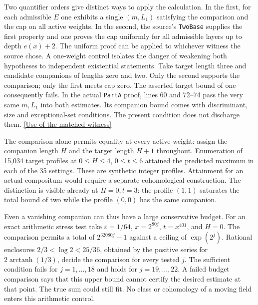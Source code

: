 \documentclass[12pt,letterpaper]{article}
\begin{document}
Two quantifier orders give distinct ways to apply the calculation. In the first, for each admissible \(E\) one exhibits a single \((m,L_1)\) satisfying the comparison and the cap on all active weights. In the second, the source's \texttt{TwoBase} supplies the first property and one proves the cap uniformly for all admissible layers up to depth \(e(x)+2\). The uniform proof can be applied to whichever witness the source chose. A one-weight control isolates the danger of weakening both hypotheses to independent existential statements. Take target length three and candidate companions of lengths zero and two. Only the second supports the comparison; only the first meets cap zero. The asserted target bound of one consequently fails. In the actual \texttt{PartA} proof, lines 60 and 72--74 pass the very same \(m,L_1\) into both estimates. Its companion bound comes with discriminant, size and exceptional-set conditions. The present condition does not discharge them.
\href{https://github.com/nousentllc/riemann-hypothesis/blob/40e56bab026552e089d7afcfeff08d2defb9c005/src/Development/AutomorphicArithmetic/AutomorphicVarieties/LayeredIsomorphisms/PartA.lean#L57-L78}{[Use of the matched witness]}

The comparison alone permits equality at every active weight: assign the companion length \(H\) and the target length \(H+1\) throughout. Enumeration of 15,034 target profiles at \(0\le H\le4\), \(0\le t\le6\) attained the predicted maximum in each of the 35 settings. These are synthetic integer profiles. Attainment for an actual compositum would require a separate cohomological construction. The distinction is visible already at \(H=0,t=3\): the profile \((1,1)\) saturates the total bound of two while the profile \((0,0)\) has the same companion.

Even a vanishing companion can thus have a large conservative budget. For an exact arithmetic stress test take \(\varepsilon=1/64\), \(x=2^{80j}\), \(t=x^{401}\), and \(H=0\). The comparison permits a total of \(2^{32080j}-1\) against a ceiling of \(\exp(2^j)\). Rational enclosures \(2/3<\log 2<25/36\), obtained by the positive series for \(2\operatorname{arctanh}(1/3)\), decide the comparison for every tested \(j\). The sufficient condition fails for \(j=1,\ldots,18\) and holds for \(j=19,\ldots,22\). A failed budget comparison says that this upper bound cannot certify the desired estimate at that point. The true sum could still fit. No class or cohomology of a moving field enters this arithmetic control.
\end{document}
